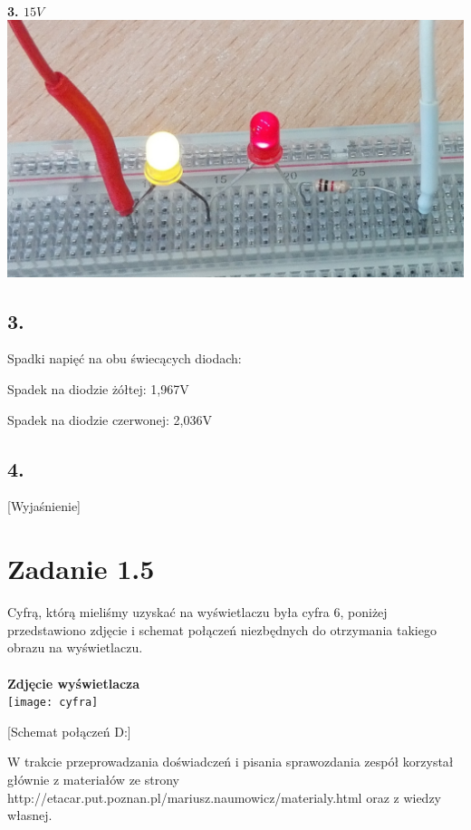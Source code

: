 \documentclass[polish,a4paper]{article}
\begin{document}
\\
\textbf{3. $15V$}\\
\includegraphics[width=\textwidth]{15V}



\subsection*{3.} Spadki napięć na obu świecących diodach:
\newline

Spadek na diodzie żółtej: 1,967V
\newline

Spadek na diodzie czerwonej: 2,036V
\newline


\subsection*{4.} [Wyjaśnienie]

\section{Zadanie 1.5}
Cyfrą, którą mieliśmy uzyskać na wyświetlaczu była cyfra 6, poniżej przedstawiono zdjęcie i schemat połączeń niezbędnych do otrzymania takiego obrazu na wyświetlaczu.\\
\\
\textbf{Zdjęcie wyświetlacza}\\
\texttt{[image: cyfra]}




[Schemat połączeń D:]




\begin{thebibliography}{9}

  W trakcie przeprowadzania doświadczeń i pisania sprawozdania zespół korzystał głównie z materiałów ze strony http://etacar.put.poznan.pl/mariusz.naumowicz/materialy.html oraz z wiedzy własnej.

\end{thebibliography}
\end{document}
